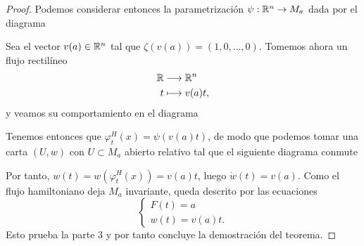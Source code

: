 \begin{proof}
   Podemos considerar entonces la parametrización $\psi:\mathbb{R}^n\rightarrow M_a$ dada por el diagrama
  \begin{center}
   \end{center}
   Sea el vector $v(a)\in \mathbb{R}^n$ tal que $\zeta(v(a))=(1,0,\dots,0)$. Tomemos ahora un flujo rectilíneo
   \begin{align*}
      \mathbb{R}&\longrightarrow \mathbb{R}^n\\ 
       t &\longmapsto  v(a)t,
     \end{align*}
   y veamos su comportamiento en el diagrama 
   \begin{center}
    \end{center}
    Tenemos entonces que $\varphi_t^H(x)=\psi(v(a)t)$, de modo que podemos tomar una carta $(U,w)$ con $U\subset M_a$ abierto relativo tal que el siguiente diagrama conmute
    \begin{center}
     \end{center}
     Por tanto, $w(t)=w(\varphi_t^H(x))=v(a)t$, luego $\dot w(t)=v(a)$. Como el flujo hamiltoniano deja $M_a$ invariante, queda descrito por las ecuaciones
 \begin{equation*}
   \begin{cases}
     F(t)=a \\
     w(t)=v(a)t.
   \end{cases}
 \end{equation*}
Esto prueba la parte $3$ y por tanto concluye la demostración del teorema.
 \end{proof}


